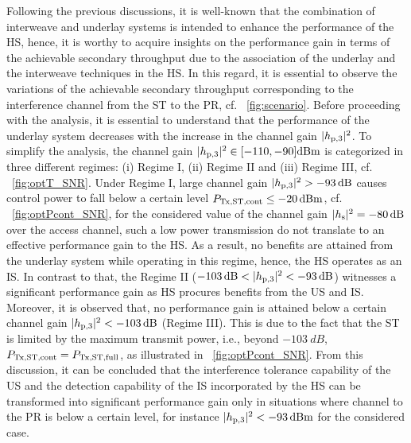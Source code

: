 Following the previous discussions, it is well-known that the combination of interweave and underlay systems is intended to enhance the performance of the HS, hence, it is worthy to acquire insights on the performance gain in terms of the achievable secondary throughput due to the association of the underlay and the interweave techniques in the HS. In this regard, it is essential to observe the variations of the achievable secondary throughput corresponding to the interference channel from the ST to the PR, cf. \figurename~\ref{fig:scenario}. Before proceeding with the analysis, it is essential to understand that the performance of the underlay system decreases with the increase in the channel gain $|h_{\text{p,3}}|^2$. To simplify the analysis, the channel gain $|h_{\text{p,3}}|^2 \in [-110, -90] \SI{}{dBm}$ is categorized in three different regimes: (i) Regime I, (ii) Regime II and (iii) Regime III, cf. \figurename~\ref{fig:optT_SNR}. Under Regime I, large channel gain $|h_{\text{p,3}}|^2 > -\SI{93}{dB}$ causes control power to fall below a certain level $P_{\text{Tx,ST,cont}} \le \SI{-20}{dBm}$, cf. \figurename~\ref{fig:optPcont_SNR}, for the considered value of the channel gain $|h_{\text{s}}|^2 = \SI{-80}{dB}$ over the access channel, such a low power transmission do not translate to an effective performance gain to the HS. As a result, no benefits are attained from the underlay system while operating in this regime, hence, the HS operates as an IS. In contrast to that, the Regime II ($-\SI{103}{dB} < |h_{\text{p,3}}|^2 < -\SI{93}{dB}$) witnesses a significant performance gain as HS procures benefits from the US and IS. Moreover, it is observed that, no performance gain is attained below a certain channel gain $|h_{\text{p,3}}|^2 < \SI{-103}{dB}$ (Regime III). This is due to the fact that the ST is limited by the maximum transmit power, i.e., beyond $\SI{-103}{dB}$, $P_{\text{Tx,ST,cont}} = P_{\text{Tx,ST,full}}$, as illustrated in \figurename~\ref{fig:optPcont_SNR}. From this discussion, it can be concluded that the interference tolerance capability of the US and the detection capability of the IS incorporated by the HS can be transformed into significant performance gain only in situations where channel to the PR is below a certain level, for instance $|h_{\text{p,3}}|^2 < -\SI{93}{dBm}$ for the considered case.




